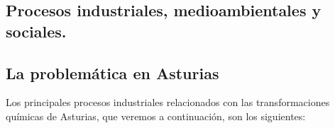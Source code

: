 \documentclass[
  spanish,
]{article}
\begin{document}
\hypertarget{procesos-industriales-medioambientales-y-sociales.}{%
\subsection{Procesos industriales, medioambientales y
sociales.}\label{procesos-industriales-medioambientales-y-sociales.}}

\hypertarget{la-problemuxe1tica-en-asturias}{%
\subsection{La problemática en
Asturias}\label{la-problemuxe1tica-en-asturias}}

Los principales procesos industriales relacionados con las
transformaciones químicas de Asturias, que veremos a continuación, son
los siguientes:
\end{document}
